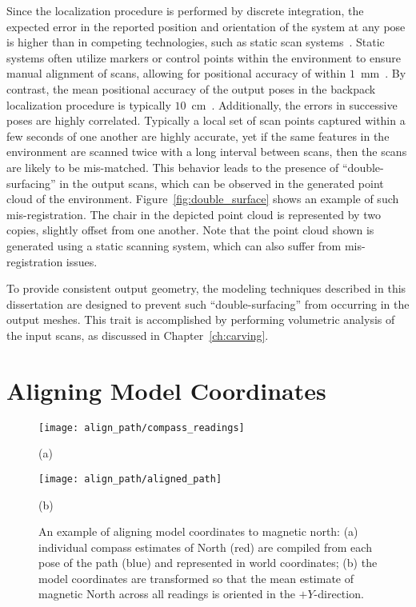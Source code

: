 \documentclass[12pt,onecolumn,oneside]{book}
\begin{document}
Since the localization procedure is performed by discrete integration, the expected error in the reported position and orientation of the system at any pose is higher than in competing technologies, such as static scan systems~\cite{liu2010indoor,Backpack,Localization}.  Static systems often utilize markers or control points within the environment to ensure manual alignment of scans, allowing for positional accuracy of within $1$~mm~\cite{Li97,Karimi00}.  By contrast, the mean positional accuracy of the output poses in the backpack localization procedure is typically $10$~cm~\cite{NickJournal}.  Additionally, the errors in successive poses are highly correlated.  Typically a local set of scan points captured within a few seconds of one another are highly accurate, yet if the same features in the environment are scanned twice with a long interval between scans, then the scans are likely to be mis-matched.  This behavior leads to the presence of ``double-surfacing'' in the output scans, which can be observed in the generated point cloud of the environment.  Figure~\ref{fig:double_surface} shows an example of such mis-registration.  The chair in the depicted point cloud is represented by two copies, slightly offset from one another.  Note that the point cloud shown is generated using a static scanning system, which can also suffer from mis-registration issues.

To provide consistent output geometry, the modeling techniques described in this dissertation are designed to prevent such ``double-surfacing'' from occurring in the output meshes.  This trait is accomplished by performing volumetric analysis of the input scans, as discussed in Chapter~\ref{ch:carving}. 

\section{Aligning Model Coordinates}
\label{sec:align_path}

\begin{figure}
	\begin{minipage}[t]{0.5\linewidth}
		\centerline{\texttt{[image: align\_path/compass\_readings]}}
		\centerline{(a)}
	\end{minipage}
	\hfill
	\begin{minipage}[t]{0.5\linewidth}
		\centerline{\texttt{[image: align\_path/aligned\_path]}}
		\centerline{(b)}
	\end{minipage}

	\caption[Aligning model coordinate system with North.]{An example of aligning model coordinates to magnetic north:  (a) individual compass estimates of North (red) are compiled from each pose of the path (blue) and represented in world coordinates; (b) the model coordinates are transformed so that the mean estimate of magnetic North across all readings is oriented in the $+Y$-direction.}
	\label{fig:align_path}
\end{figure}
\end{document}
